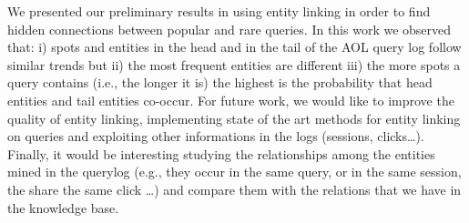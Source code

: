 We presented our preliminary results in using entity linking in order
to find hidden connections between popular and rare queries. 
In this work we observed that: i) spots and entities 
in the head and in the tail of the AOL query log follow similar trends but ii) 
the most frequent entities are different iii) the more spots a query contains 
(i.e., the longer it is) the highest is the probability that head entities and
tail entities co-occur. For future work, we would like to improve the quality 
of entity linking, implementing state of the art methods for entity linking on queries and
exploiting other informations in the logs (sessions, clicks\dots). Finally, it would 
be interesting studying the relationships among the entities mined in the querylog
(e.g., they occur in the same query, or in the same session, the share the same click \dots) and
compare them with the relations that we have in the knowledge base.
